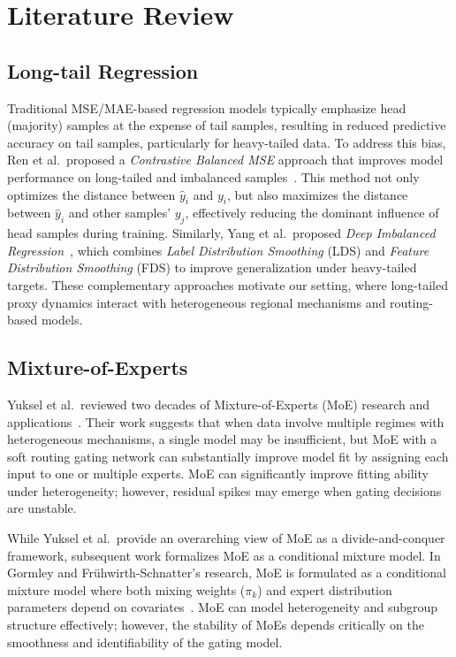 \documentclass[11pt,conference,onecolumn]{IEEEtran}
\begin{document}
\section{Literature Review}
\subsection{Long-tail Regression}

Traditional MSE/MAE-based regression models typically emphasize head (majority) samples at the expense of tail samples, resulting in reduced predictive accuracy on tail samples, particularly for heavy-tailed data. To address this bias, Ren et al.\ proposed a \emph{Contrastive Balanced MSE} approach that improves model performance on long-tailed and imbalanced samples~\cite{ren2022balancedmse}. This method not only optimizes the distance between $\hat{y}_i$ and $y_i$, but also maximizes the distance between $\hat{y}_i$ and other samples' $y_j$, effectively reducing the dominant influence of head samples during training. Similarly, Yang et al.\ proposed \emph{Deep Imbalanced Regression}~\cite{yang2021dir}, which combines \emph{Label Distribution Smoothing} (LDS) and \emph{Feature Distribution Smoothing} (FDS) to improve generalization under heavy-tailed targets. These complementary approaches motivate our setting, where long-tailed proxy dynamics interact with heterogeneous regional mechanisms and routing-based models.

\subsection{Mixture-of-Experts}

Yuksel et al.\ reviewed two decades of Mixture-of-Experts (MoE) research and applications~\cite{yuksel2012twenty}. Their work suggests that when data involve multiple regimes with heterogeneous mechanisms, a single model may be insufficient, but MoE with a soft routing gating network can substantially improve model fit by assigning each input to one or multiple experts. MoE can significantly improve fitting ability under heterogeneity; however, residual spikes may emerge when gating decisions are unstable.

While Yuksel et al.\ provide an overarching view of MoE as a divide-and-conquer framework, subsequent work formalizes MoE as a conditional mixture model. In Gormley and Frühwirth-Schnatter's research, MoE is formulated as a conditional mixture model where both mixing weights ($\pi_k$) and expert distribution parameters depend on covariates~\cite{gormley2018moe}. MoE can model heterogeneity and subgroup structure effectively; however, the stability of MoEs depends critically on the smoothness and identifiability of the gating model.
\end{document}

